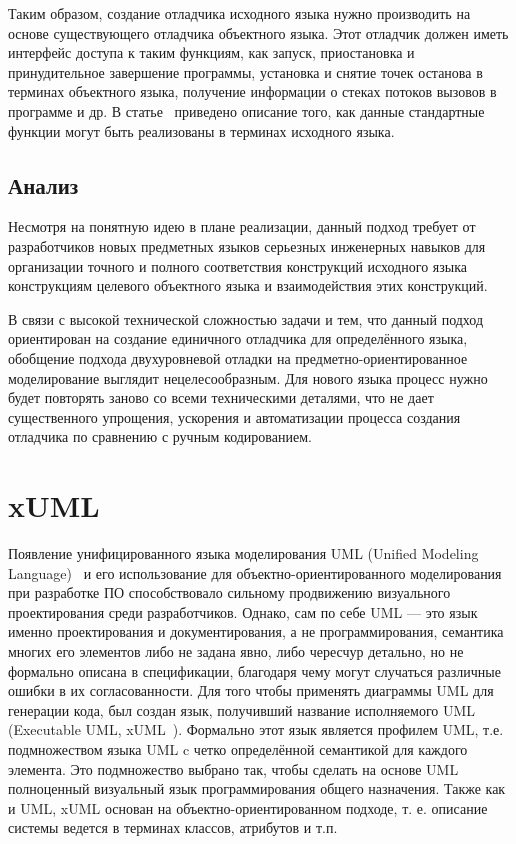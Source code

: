 \documentclass[a5paper]{article}
\begin{document}
Таким образом, создание отладчика исходного языка нужно производить на основе существующего отладчика объектного языка. Этот отладчик должен иметь интерфейс доступа к таким функциям, как запуск, приостановка и принудительное завершение программы, установка и снятие точек останова в терминах объектного языка, получение информации о стеках потоков вызовов в программе и др. В статье~\cite{kartashev} приведено описание того, как данные стандартные функции могут быть реализованы в терминах исходного языка.

\subsection{Анализ}

Несмотря на понятную идею в плане реализации, данный подход требует от разработчиков новых предметных языков серьезных инженерных навыков для организации точного и полного соответствия конструкций исходного языка конструкциям целевого объектного языка и взаимодействия этих конструкций. 

В связи с высокой технической сложностью задачи и тем, что данный подход ориентирован на создание единичного отладчика для определённого языка, обобщение подхода двухуровневой отладки на предметно-ориентированное моделирование выглядит нецелесообразным. Для нового языка процесс нужно будет повторять заново со всеми техническими деталями, что не дает существенного упрощения, ускорения и автоматизации процесса создания отладчика по сравнению с ручным кодированием.

\section{xUML}

Появление унифицированного языка моделирования UML (Unified Modeling Language)~\cite{uml} и его использование для объектно-ориентированного моделирования при разработке ПО способствовало сильному продвижению визуального проектирования среди разработчиков. Однако, сам по себе UML --- это язык именно проектирования и документирования, а не программирования, семантика многих его элементов либо не задана явно, либо чересчур детально, но не формально описана в спецификации, благодаря чему могут случаться различные ошибки в их согласованности. Для того чтобы применять диаграммы UML для генерации кода, был создан язык, получивший название исполняемого UML (Executable UML, xUML~\cite{xuml1, xuml2, xuml3}). Формально этот язык является профилем UML, т.е. подмножеством языка UML c четко определённой семантикой для каждого элемента. Это подмножество выбрано так, чтобы сделать на основе UML полноценный визуальный язык программирования общего назначения. Также как и UML, xUML основан на объектно-ориентированном подходе,
 т.
е. описание системы ведется в терминах классов, атрибутов и т.п.
\end{document}
